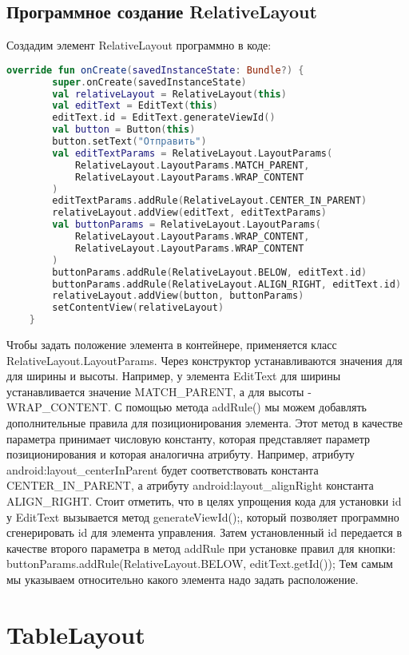 \subsection{Программное создание RelativeLayout}
Создадим элемент RelativeLayout программно в коде:
\begin{lstlisting}[language=Kotlin, caption=\leftline{Kotlin}, label=lst:RelativeLayout2]
override fun onCreate(savedInstanceState: Bundle?) {
        super.onCreate(savedInstanceState)
        val relativeLayout = RelativeLayout(this)
        val editText = EditText(this)
        editText.id = EditText.generateViewId()
        val button = Button(this)
        button.setText("Отправить")
        val editTextParams = RelativeLayout.LayoutParams(
            RelativeLayout.LayoutParams.MATCH_PARENT,
            RelativeLayout.LayoutParams.WRAP_CONTENT
        )
        editTextParams.addRule(RelativeLayout.CENTER_IN_PARENT)
        relativeLayout.addView(editText, editTextParams)
        val buttonParams = RelativeLayout.LayoutParams(
            RelativeLayout.LayoutParams.WRAP_CONTENT,
            RelativeLayout.LayoutParams.WRAP_CONTENT
        )
        buttonParams.addRule(RelativeLayout.BELOW, editText.id)
        buttonParams.addRule(RelativeLayout.ALIGN_RIGHT, editText.id)
        relativeLayout.addView(button, buttonParams)
        setContentView(relativeLayout)
    }
\end{lstlisting}
Чтобы задать положение элемента в контейнере, применяется класс
RelativeLayout.LayoutParams.
Через конструктор устанавливаются значения
для для ширины и высоты.
Например, у элемента EditText для ширины
устанавливается значение MATCH\_PARENT, а для высоты -
WRAP\_CONTENT.
С помощью метода addRule() мы можем добавлять дополнительные правила
для позиционирования элемента.
Этот метод в качестве параметра принимает
числовую константу, которая представляет параметр позиционирования и
которая аналогична атрибуту.
Например, атрибуту
android:layout\_centerInParent будет соответствовать константа
CENTER\_IN\_PARENT, а атрибуту android:layout\_alignRight константа
ALIGN\_RIGHT.
Стоит отметить, что в целях упрощения кода для установки id у EditText
вызывается метод generateViewId();, который позволяет программно
сгенерировать id для элемента управления.
Затем установленный id передается в качестве второго параметра в метод
addRule при установке правил для кнопки:
buttonParams.addRule(RelativeLayout.BELOW, editText.getId());
Тем самым мы указываем относительно какого элемента надо задать
расположение.
\section{TableLayout}
